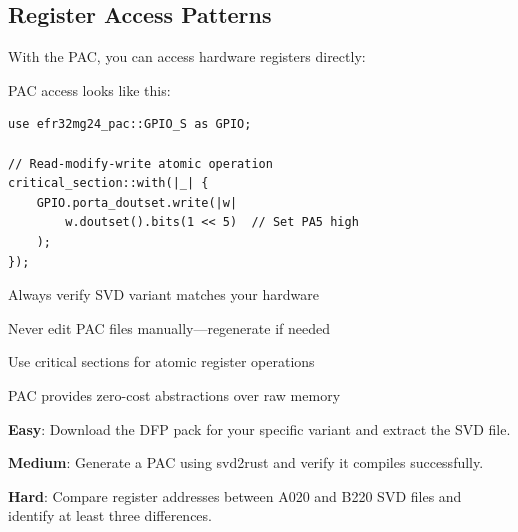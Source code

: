 \subsection{Register Access Patterns}
\label{subsec:register-access}

With the PAC, you can access hardware registers directly:

\begin{exampleoutput}
PAC access looks like this:
\end{exampleoutput}

\begin{verbatim}
use efr32mg24_pac::GPIO_S as GPIO;

// Read-modify-write atomic operation
critical_section::with(|_| {
    GPIO.porta_doutset.write(|w|
        w.doutset().bits(1 << 5)  // Set PA5 high
    );
});
\end{verbatim}

\begin{keytakeaways}
    \item Always verify SVD variant matches your hardware
    \item Never edit PAC files manually—regenerate if needed
    \item Use critical sections for atomic register operations
    \item PAC provides zero-cost abstractions over raw memory
\end{keytakeaways}

\begin{exercises}
    \item\textbf{Easy}: Download the DFP pack for your specific variant and extract the SVD file.
    
    \item\textbf{Medium}: Generate a PAC using svd2rust and verify it compiles successfully.
    
    \item\textbf{Hard}: Compare register addresses between A020 and B220 SVD files and identify at least three differences.
\end{exercises}
